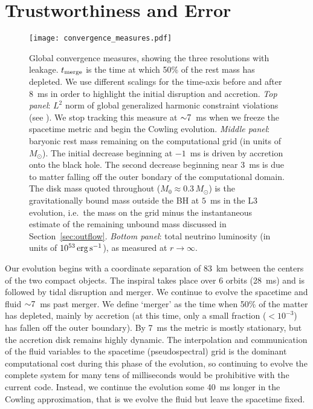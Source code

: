 \section{Trustworthiness and Error}
\label{sec:grhydroconvergence}

\begin{figure*}[t] \centering
\texttt{[image: convergence\_measures.pdf]}
\caption{
Global convergence measures,
showing the three resolutions with leakage.
$t_{\rm merge}$ is the time at which 50\% of the rest mass has depleted.
We use different scalings for the time-axis before and after 8~ms
in order to highlight the initial disruption and accretion.
{\em Top panel}: $L^2$ norm of global generalized harmonic constraint
violations (see \citealt{Lindblom:2007}). We stop tracking this measure at
$\mathord{\sim}7$~ms when we freeze the spacetime metric and begin the Cowling evolution.
{\em Middle panel}: baryonic rest mass remaining on the computational
grid (in units of $M_{\odot}$). The initial decrease beginning at $-1$~ms is
driven by accretion onto the black hole.
The second decrease beginning near $3$~ms is due to matter falling off the outer
bondary of the computational domain.
The disk mass quoted throughout ($M_0 \approx 0.3\,M_{\odot}$) is
the gravitationally bound mass outside the BH at $5$~ms in the L3 evolution,
i.e.\ the mass on the grid minus the instantaneous estimate of the remaining unbound mass
discussed in Section~\ref{sec:outflow}.
{\em Bottom panel}: total neutrino luminosity (in units of $10^{53}\rm\,erg\,s^{-1}$),
as measured at $r \rightarrow \infty$.
}
\label{fig:convergence}
\end{figure*}

Our evolution begins with a coordinate separation of 83~km
between the centers of the two compact objects.
The inspiral takes place over 6 orbits (28~ms) and is followed by tidal disruption and merger.
We continue to evolve the spacetime and fluid $\mathord{\sim}7$~ms past merger.
We define `merger' as the time when 50\% of the matter has
depleted, mainly by accretion (at this time, only a small fraction
($<10^{-3}$) has fallen off the outer boundary).
By 7~ms the metric is mostly stationary, but the accretion disk remains
highly dynamic.  The interpolation and communication of the fluid variables
to the spacetime (pseudospectral) grid is the dominant
computational cost during this phase of the evolution,
so continuing to evolve the complete system for many tens of
milliseconds would be prohibitive with the current code.  Instead,
we continue the evolution some 40~ms longer in
the Cowling approximation, that is we evolve the fluid but leave
the spacetime fixed.

